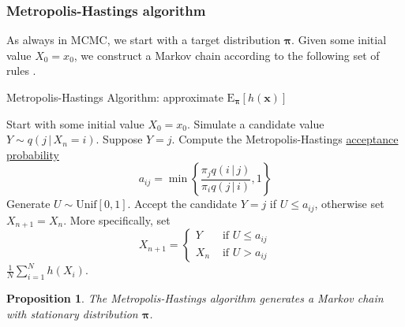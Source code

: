 \documentclass[11pt]{article}\usepackage[]{graphicx}\usepackage[]{color}
\numberwithin{algorithm}{section}
\newtheorem*{prop}{Proposition}
\theoremstyle{remark}
\theoremstyle{definition}
\begin{document}
\subsubsection{Metropolis-Hastings algorithm}
As always in MCMC, we start with a target distribution $\boldsymbol{\pi}$. 
Given some initial value $X_0 = x_0$, we construct a Markov chain according to the following set of rules \citep{Hastings1970}.
\begin{algorithm}
\caption{Metropolis-Hastings Algorithm: approximate $\text{E}_{\boldsymbol{\pi}}[h(\mathbf{x})]$}
\label{accept-reject}
\begin{algorithmic}[1]
  \STATE Start with some initial value $X_0 = x_0$.
  \STATE Simulate a candidate value $Y \sim q(j\,|\,X_n=i)$. Suppose $Y=j$.
  \STATE Compute the Metropolis-Hastings \underline{acceptance probability}
  \begin{equation*}
    a_{ij} = \min \left\{ \frac{\pi_j q(i\,|\, j)}{\pi_i q(j\,|\, i)}, 1 \right\}
  \end{equation*}
  \STATE Generate $U \sim \text{Unif}[0,1]$.  
  \STATE Accept the candidate $Y=j$ if $U \le a_{ij}$, otherwise set $X_{n+1} = X_n$. 
  More specifically, set
  \begin{equation*}
    X_{n+1} = \begin{cases} 
       Y & \text{ if } U \le a_{ij} \\
       X_n & \text{ if } U > a_{ij} 
     \end{cases} 
 \end{equation*}
\ENDFOR
\RETURN $\frac{1}{N} \sum_{i = 1}^N h(X_i)$.
\end{algorithmic}
\end{algorithm}

\begin{prop} 
  The Metropolis-Hastings algorithm generates a Markov chain with stationary distribution 
  $\boldsymbol{\pi}$.
\end{prop}
\end{document}
